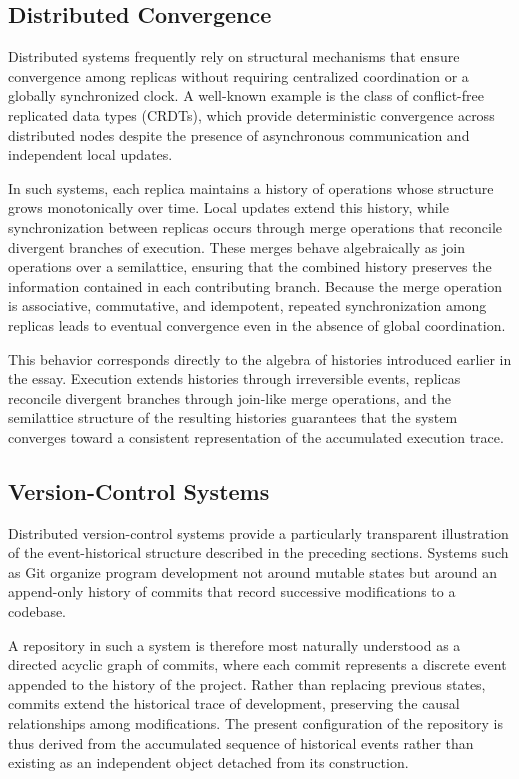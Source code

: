 \documentclass[12pt]{article}
\begin{document}
\subsection{Distributed Convergence}

Distributed systems frequently rely on structural
mechanisms that ensure convergence among replicas
without requiring centralized coordination or a
globally synchronized clock. A well-known example
is the class of conflict-free replicated data types
(CRDTs), which provide deterministic convergence
across distributed nodes despite the presence of
asynchronous communication and independent local
updates.

In such systems, each replica maintains a history
of operations whose structure grows monotonically
over time. Local updates extend this history,
while synchronization between replicas occurs
through merge operations that reconcile divergent
branches of execution. These merges behave
algebraically as join operations over a semilattice,
ensuring that the combined history preserves the
information contained in each contributing branch.
Because the merge operation is associative,
commutative, and idempotent, repeated synchronization
among replicas leads to eventual convergence even
in the absence of global coordination.

This behavior corresponds directly to the algebra
of histories introduced earlier in the essay.
Execution extends histories through irreversible
events, replicas reconcile divergent branches
through join-like merge operations, and the
semilattice structure of the resulting histories
guarantees that the system converges toward a
consistent representation of the accumulated
execution trace.

\subsection{Version-Control Systems}

Distributed version-control systems provide a particularly
transparent illustration of the event-historical structure
described in the preceding sections. Systems such as Git
organize program development not around mutable states
but around an append-only history of commits that record
successive modifications to a codebase.

A repository in such a system is therefore most naturally
understood as a directed acyclic graph of commits, where
each commit represents a discrete event appended to the
history of the project. Rather than replacing previous
states, commits extend the historical trace of development,
preserving the causal relationships among modifications.
The present configuration of the repository is thus derived
from the accumulated sequence of historical events rather
than existing as an independent object detached from its
construction.
\end{document}
